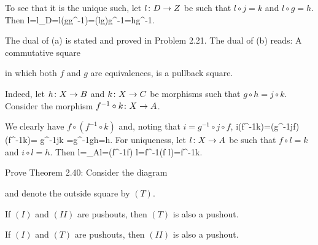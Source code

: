 To see that it is the unique such, let $l\colon D\to Z$ be such that $l\circ j=k$ and $l\circ g=h$. Then
\bse
l=l\circ \id_D=l\circ (g\circ g^{-1})=(l\circ g)\circ g^{-1}=h\circ g^{-1}.
\ese
\item The dual of (a) is stated and proved in Problem 2.21. The dual of (b) reads: A commutative square
\bse
{}
\ese
in which both $f$ and $g$ are equivalences, is a pullback square.

Indeed, let $h\colon X\to B$ and $k\colon X\to C$ be morphisms such that $g\circ h=j\circ k$. Consider the morphism $f^{-1}\circ k\colon X\to A$.
\bse
{}
\ese
We clearly have $f\circ (f^{-1}\circ k)$ and, noting that $i=g^{-1}\circ j\circ f$,
\bse
i\circ(f^{-1}\circ k)=(g^{-1}\circ j\circ f)\circ(f^{-1}\circ k)= g^{-1}\circ j\circ k =g^{-1}\circ g\circ h=h.
\ese
For uniqueness, let $l\colon X\to A$ be such that $f\circ l=k$ and $i\circ l=h$. Then
\bse
l=\id_A\circ l=(f^{-1}\circ f) \circ l=f^{-1}\circ (f \circ l)=f^{-1}\circ k.
\ese
\een
\es

\bp
Prove Theorem 2.40: Consider the diagram
\bse
{}
\ese
and denote the outside square by $(T)$.
\ben[label=(\alph*)]
\item If $(I)$ and $(II)$ are pushouts, then $(T)$ is also a pushout.
\item If $(I)$ and $(T)$ are pushouts, then $(II)$ is also a pushout.
\een
\ep

